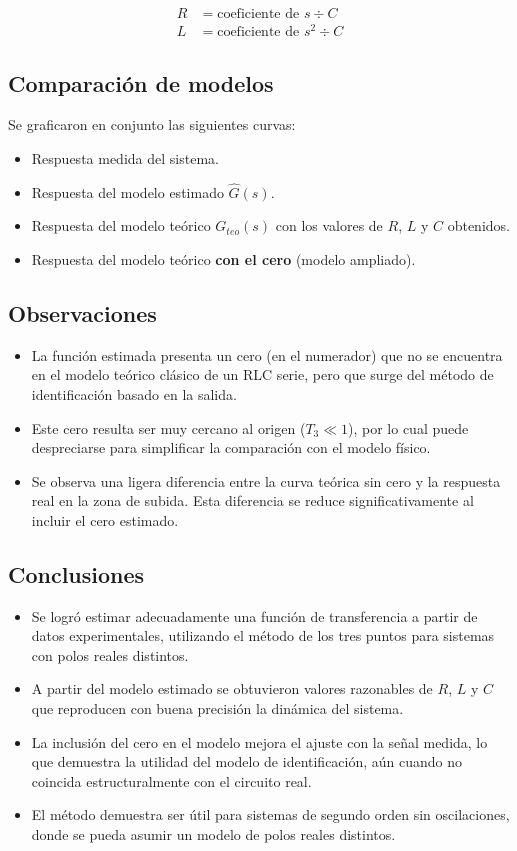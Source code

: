 \documentclass{article}
\begin{document}
\begin{align}
R &= \text{coeficiente de } s \div C \\
L &= \text{coeficiente de } s^2 \div C
\end{align}

\subsection*{Comparación de modelos}
Se graficaron en conjunto las siguientes curvas:
\begin{itemize}
    \item Respuesta medida del sistema.
    \item Respuesta del modelo estimado $\hat{G}(s)$.
    \item Respuesta del modelo teórico $G_{teo}(s)$ con los valores de $R$, $L$ y $C$ obtenidos.
    \item Respuesta del modelo teórico \textbf{con el cero} (modelo ampliado).
\end{itemize}

\subsection*{Observaciones}
\begin{itemize}
    \item La función estimada presenta un cero (en el numerador) que no se encuentra en el modelo teórico clásico de un RLC serie, pero que surge del método de identificación basado en la salida.
    \item Este cero resulta ser muy cercano al origen ($T_3 \ll 1$), por lo cual puede despreciarse para simplificar la comparación con el modelo físico.
    \item Se observa una ligera diferencia entre la curva teórica sin cero y la respuesta real en la zona de subida. Esta diferencia se reduce significativamente al incluir el cero estimado.
\end{itemize}

\subsection*{Conclusiones}
\begin{itemize}
    \item Se logró estimar adecuadamente una función de transferencia a partir de datos experimentales, utilizando el método de los tres puntos para sistemas con polos reales distintos.
    \item A partir del modelo estimado se obtuvieron valores razonables de $R$, $L$ y $C$ que reproducen con buena precisión la dinámica del sistema.
    \item La inclusión del cero en el modelo mejora el ajuste con la señal medida, lo que demuestra la utilidad del modelo de identificación, aún cuando no coincida estructuralmente con el circuito real.
    \item El método demuestra ser útil para sistemas de segundo orden sin oscilaciones, donde se pueda asumir un modelo de polos reales distintos.
\end{itemize}
\end{document}
